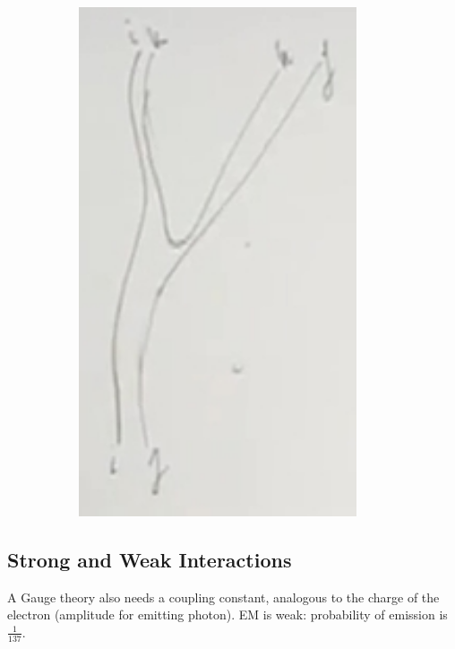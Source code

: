 \documentclass[]{article}
\begin{document}
\begin{figure}[H]
\begin{subfigure}{0.45\textwidth}
		\includegraphics[width=0.9\textwidth]{2-5-gluon-gluon.jpg}
	\end{subfigure}
\end{figure}

\subsection{Strong and Weak Interactions}

A Gauge theory also needs a coupling constant, analogous to the charge of the electron (amplitude for emitting photon). EM is weak: probability of emission is $\frac{1}{137}$.
\end{document}
